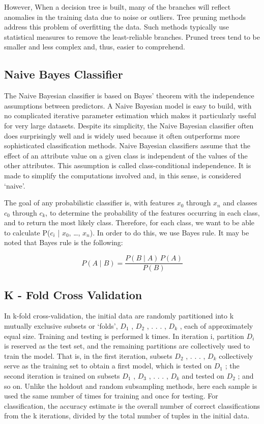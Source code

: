 \documentclass[12pt]{article}
\begin{document}
However, When a decision tree is built, many of the branches will reflect anomalies in the training data due to noise or outliers. Tree pruning methods address this problem of overfitting the data. Such methods typically use statistical measures to remove the least-reliable branches. Pruned trees tend to be smaller and less complex and, thus, easier to comprehend.


\subsection{Naive Bayes Classifier}
		
The Naive Bayesian classifier is based on Bayes’ theorem with the independence assumptions between predictors. A Naive Bayesian model is easy to build, with no complicated iterative parameter estimation which makes it particularly useful for very large datasets. Despite its simplicity, the Naive Bayesian classifier often does surprisingly well and is widely used because it often outperforms more sophisticated classification methods. Naive Bayesian classifiers assume that the effect of an attribute value on a given class is independent of the values of the other attributes. This assumption is called class-conditional independence. It is made to simplify the computations involved and, in this sense, is considered `naive'.

The goal of any probabilistic classifier is, with features $ x_0 $ through $ x_n $ and classes $ c_0 $ through $ c_k $, to determine the probability of the features occurring in each class, and to return the most likely class. Therefore, for each class, we want to be able to calculate P($ c_i $ | $ x_0 $, …, $ x_n $). In order to do this, we use Bayes rule. It may be noted that Bayes rule is the following:

$$ P(A \mid B) = \frac{P(B \mid A) \, P(A)}{P(B)} $$

\subsection{K - Fold Cross Validation}
In k-fold cross-validation, the initial data are randomly partitioned into k mutually exclusive subsets or `folds', $ D_1 $ , $ D_2 $ , . . . , $ D_k $ , each of approximately equal size. Training and testing is performed k times. In iteration i, partition $ D_i $ is reserved as the test set, and the remaining partitions are collectively used to train the model. That is, in the first iteration, subsets $ D_2 $ , . . . , $ D_k $ collectively serve as the training set to obtain a first model, which is tested on $ D_1 $ ; the second iteration is trained on subsets $ D_1 $ , $ D_3 $ , . . . , $ D_k $ and tested on $ D_2 $ ; and so on. Unlike the holdout and random subsampling methods, here each sample is used the same number of times for training and once for testing. For classification, the accuracy estimate is the overall number of correct classifications from the k iterations, divided by the total number of tuples in the initial data.
\end{document}
